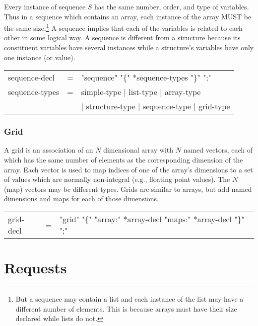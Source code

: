 \documentclass{article}
\begin{document}
\noindent Every instance of sequence $S$ has the same number, order, and
type of variables. Thus in a sequence which contains an array, each instance
of the array MUST be the same size.\footnote{But a sequence may contain a
  list and each instance of the list may have a different number of elements.
  This is because arrays must have their size declared while lists do not.} A
sequence implies that each of the variables is related to each other in some
logical way. A sequence is different from a structure because its constituent
variables have several instances while a structure's variables have only one
instance (or value).

\begin{ttfamily}
\begin{center}
\begin{tabular}{lll}
sequence-decl & = & "sequence" "\{" *sequence-types "\}" ";" \\
sequence-types & = & simple-type | list-type | array-type \\
                & & | structure-type | sequence-type | grid-type \\
\end{tabular}
\end{center}
\end{ttfamily}

\subsubsection{Grid}
\label{sec:grid}
 A grid is an association of an $N$ dimensional array with $N$
  named vectors, each of which has the same number of elements as the
  corresponding dimension of the array. Each vector is used to map indices of
  one of the array's dimensions to a set of values which are normally
  non-integral (e.g., floating point values). The $N$ (map) vectors may be
  different types. Grids are similar to arrays, but add named dimensions and
  maps for each of those dimensions.
  \label{page:grids} 

\begin{ttfamily}
\begin{center}
\begin{tabular}{lll}
grid-decl & = & "grid" "\{" "array:" *array-decl "maps:" *array-decl "\}" ";" \\
\end{tabular}
\end{center}
\end{ttfamily}

\section{Requests}
\end{document}
